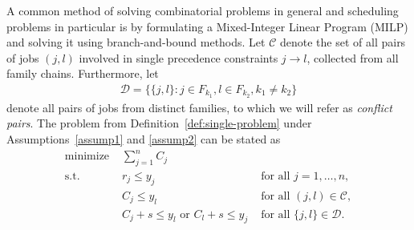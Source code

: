 \documentclass{article}
\theoremstyle{definition}
\theoremstyle{plain}
\begin{document}
A common method of solving combinatorial problems in general and scheduling
problems in particular is by formulating a Mixed-Integer Linear Program (MILP)
and solving it using branch-and-bound methods. Let $\mathcal{C}$ denote the set
of all pairs of jobs $(j,l)$ involved in single precedence constraints
$j \rightarrow l$, collected from all family chains. Furthermore, let
\begin{align}
  \mathcal{D} = \{ \{j,l\} : j \in F_{k_{1}}, l \in F_{k_{2}}, k_{1} \neq k_{2} \}
\end{align}
denote all pairs of jobs from distinct families, to which we will refer as
\textit{conflict pairs}. The problem from Definition~\ref{def:single-problem}
under Assumptions~\ref{assump1} and \ref{assump2} can be stated as
%
\begin{subequations}
\begin{align}
  \text{minimize } & \sum_{j=1}^{n} C_{j} & \\
  \text{s.t. } & r_{j} \leq y_{j} & \text{ for all } j=1, \dots, n, \\
              & C_{j} \leq y_{l} & \text{ for all } (j,l) \in \mathcal{C}, \\
              & C_{j} + s \leq y_{l} \text{ or } C_{l} + s \leq y_{j} & \text{ for all } \{j,l\} \in \mathcal{D}. \label{eq:natural-disjunctions}
\end{align}
\end{subequations}
\end{document}
